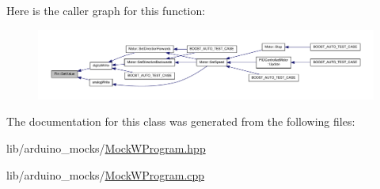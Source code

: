 Here is the caller graph for this function\-:
\nopagebreak
\begin{figure}[H]
\begin{center}
\leavevmode
\includegraphics[width=350pt]{class_pin_adc8d5cd4aeca8cce795e85b3fe1d9a20_icgraph}
\end{center}
\end{figure}




The documentation for this class was generated from the following files\-:\begin{DoxyCompactItemize}
\item 
lib/arduino\-\_\-mocks/\hyperlink{_mock_w_program_8hpp}{Mock\-W\-Program.\-hpp}\item 
lib/arduino\-\_\-mocks/\hyperlink{_mock_w_program_8cpp}{Mock\-W\-Program.\-cpp}\end{DoxyCompactItemize}
